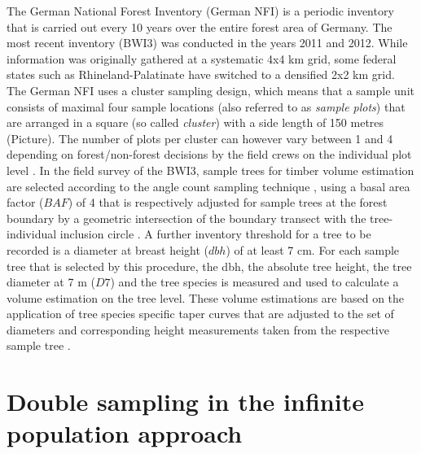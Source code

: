 The German National Forest Inventory (German NFI) is a periodic inventory that is carried out every 10 years over the entire forest area of Germany. The most recent inventory (BWI3) was conducted in the years 2011 and 2012. While information was originally gathered at a systematic 4x4 km grid, some federal states such as Rhineland-Palatinate have switched to a densified 2x2 km grid. The German NFI uses a cluster sampling design, which means that a sample unit consists of maximal four sample locations (also referred to as \textit{sample plots}) that are arranged in a square (so called \textit{cluster}) with a side length of 150 metres (Picture). The number of plots per cluster can however vary between 1 and 4 depending on forest/non-forest decisions by the field crews on the individual plot level \citep{bwi3_aufn}. In the field survey of the BWI3, sample trees for timber volume estimation are selected according to the angle count sampling technique \citep{bitterlich1984}, using a basal area factor ($BAF$) of 4 that is respectively adjusted for sample trees at the forest boundary by a geometric intersection of the boundary transect with the tree-individual inclusion circle \citep{bwi3_aufn}. A further inventory threshold for a tree to be recorded is a diameter at breast height ($dbh$) of at least 7 cm. For each sample tree that is selected by this procedure, the dbh, the absolute tree height, the tree diameter at 7 m ($D7$) and the tree species is measured and used to calculate a volume estimation on the tree level. These volume estimations are based on the application of tree species specific taper curves that are adjusted to the set of diameters and corresponding height measurements taken from the respective sample tree \citep{kublin2013}.


\section{Double sampling in the infinite population approach}
\label{sec:inf_pop}

